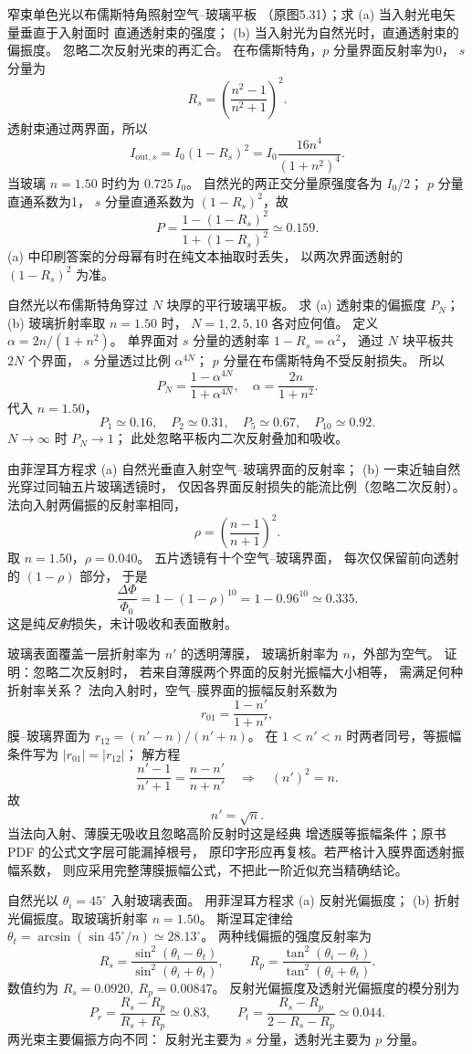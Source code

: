 窄束单色光以布儒斯特角照射空气--玻璃平板
（原图5.31）；求 (a) 当入射光电矢量垂直于入射面时
直通透射束的强度；
(b) 当入射光为自然光时，直通透射束的偏振度。
忽略二次反射光束的再汇合。
\exsolution
在布儒斯特角，$p$ 分量界面反射率为0，
$s$ 分量为
\[
 R_s=\left(\frac{n^2-1}{n^2+1}\right)^2.
\]
透射束通过两界面，所以
\[
 \boxed{I_{\mathrm{out},s}
 =I_0(1-R_s)^2
 =I_0\frac{16n^4}{(1+n^2)^4}}.
\]
当玻璃 $n=1.50$ 时约为 $0.725\,I_0$。
自然光的两正交分量原强度各为 $I_0/2$；
$p$ 分量直通系数为1，
$s$ 分量直通系数为 $(1-R_s)^2$，故
\[
 \boxed{P=\frac{1-(1-R_s)^2}
 {1+(1-R_s)^2}\simeq0.159}.
\]
\excheck (a) 中印刷答案的分母幂有时在纯文本抽取时丢失，
以两次界面透射的 $(1-R_s)^2$ 为准。

自然光以布儒斯特角穿过 $N$ 块厚的平行玻璃平板。
求 (a) 透射束的偏振度 $P_N$；
(b) 玻璃折射率取 $n=1.50$ 时，
$N=1,2,5,10$ 各对应何值。
\exsolution
定义 $\alpha=2n/(1+n^2)$。
单界面对 $s$ 分量的透射率
$1-R_s=\alpha^2$，
通过 $N$ 块平板共 $2N$ 个界面，
$s$ 分量透过比例 $\alpha^{4N}$；
$p$ 分量在布儒斯特角不受反射损失。
所以
\[
 \boxed{P_N=\frac{1-\alpha^{4N}}{1+\alpha^{4N}},
 \quad \alpha=\frac{2n}{1+n^2}}.
\]
代入 $n=1.50$，
\[
 \boxed{P_1\simeq0.16,\quad P_2\simeq0.31,\quad
 P_5\simeq0.67,\quad P_{10}\simeq0.92}.
\]
\excheck $N\to\infty$ 时 $P_N\to1$；
此处忽略平板内二次反射叠加和吸收。

由菲涅耳方程求 (a) 自然光垂直入射空气--玻璃界面的反射率；
(b) 一束近轴自然光穿过同轴五片玻璃透镜时，
仅因各界面反射损失的能流比例（忽略二次反射）。
\exsolution
法向入射两偏振的反射率相同，
\[
 \boxed{\rho=\left(\frac{n-1}{n+1}\right)^2}.
\]
取 $n=1.50$，$\rho=0.040$。
五片透镜有十个空气--玻璃界面，
每次仅保留前向透射的 $(1-\rho)$ 部分，
于是
\[
 \boxed{\frac{\Delta\Phi}{\Phi_0}
 =1-(1-\rho)^{10}
 =1-0.96^{10}\simeq0.335}.
\]
\excheck 这是纯\emph{反射}损失，未计吸收和表面散射。

玻璃表面覆盖一层折射率为 $n'$ 的透明薄膜，
玻璃折射率为 $n$，外部为空气。
证明：忽略二次反射时，
若来自薄膜两个界面的反射光振幅大小相等，
需满足何种折射率关系？
\exsolution
法向入射时，空气--膜界面的振幅反射系数为
\[
 r_{01}=\frac{1-n'}{1+n'},
\]
膜--玻璃界面为 $r_{12}=(n'-n)/(n'+n)$。
在 $1<n'<n$ 时两者同号，等振幅条件写为
$|r_{01}|=|r_{12}|$；
解方程
\[
 \frac{n'-1}{n'+1}=\frac{n-n'}{n+n'}
 \quad\Longrightarrow\quad (n')^2=n.
\]
故
\[
 \boxed{n'=\sqrt n}.
\]
\excheck 当法向入射、薄膜无吸收且忽略高阶反射时这是经典
增透膜等振幅条件；原书 PDF 的公式文字层可能漏掉根号，
原印字形应再复核。若严格计入膜界面透射振幅系数，
则应采用完整薄膜振幅公式，不把此一阶近似充当精确结论。

自然光以 $\theta_i=45^\circ$ 入射玻璃表面。
用菲涅耳方程求 (a) 反射光偏振度；
(b) 折射光偏振度。取玻璃折射率 $n=1.50$。
\exsolution
斯涅耳定律给
$\theta_t=\arcsin(\sin45^\circ/n)\simeq28.13^\circ$。
两种线偏振的强度反射率为
\[
 R_s=\frac{\sin^2(\theta_i-\theta_t)}
 {\sin^2(\theta_i+\theta_t)},\qquad
 R_p=\frac{\tan^2(\theta_i-\theta_t)}
 {\tan^2(\theta_i+\theta_t)}.
\]
数值约为 $R_s=0.0920,\ R_p=0.00847$。
反射光偏振度及透射光偏振度的模分别为
\[
 \boxed{P_r=\frac{R_s-R_p}{R_s+R_p}\simeq0.83},
 \qquad
 \boxed{P_t=\frac{R_s-R_p}{2-R_s-R_p}\simeq0.044}.
\]
\excheck 两光束主要偏振方向不同：
反射光主要为 $s$ 分量，透射光主要为 $p$ 分量。
